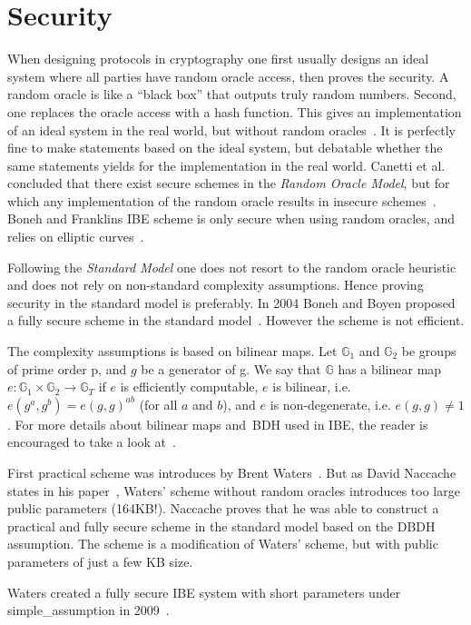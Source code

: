 \section{Security}\label{ibe-secureness}
When designing protocols in cryptography one first usually designs an ideal system where all parties have random oracle access, then proves the security.
A random oracle is like a ``black box'' that outputs truly random numbers.
Second, one replaces the oracle access with a hash function.
This gives an implementation of an ideal system in the real world, but without random oracles~\cite{DBLP:conf/ccs/BellareR93}. 
It is perfectly fine to make statements based on the ideal system, but debatable whether the same statements yields for the implementation in the real world.
Canetti et al. concluded that there exist secure schemes in the \textit{Random Oracle Model}, but for which any implementation of the random oracle results in insecure schemes~\cite{DBLP:journals/jacm/CanettiGH04}.
Boneh and Franklins \gls{IBE} scheme is only secure when using random oracles, and relies on elliptic curves~\cite{DBLP:conf/crypto/BonehF01}.

Following the \textit{Standard Model} one does not resort to the random oracle heuristic and does not rely on non-standard complexity assumptions.
Hence proving security in the standard model is preferably.
In 2004 Boneh and Boyen proposed a fully secure scheme in the standard model~\cite{DBLP:conf/crypto/BonehB04}.
However the scheme is not efficient. 

The complexity assumptions is based on bilinear maps.
Let $\mathbb{G}_1$ and $\mathbb{G}_2$ be groups of prime order \gls{p}, and $g$ be a generator of \gls{g}. 
We say that $\mathbb{G}$ has a bilinear map $e : \mathbb{G}_1 \times \mathbb{G}_2 \to \mathbb{G}_T$ if $e$ is efficiently computable, $e$ is bilinear, i.e. $e(g^a, g^b) = e(g, g)^{ab}$ (for all $a$ and $b$), and $e$ is non-degenerate, i.e. $e(g,g)\neq 1$.
For more details about bilinear maps and~\gls{BDH} used in \gls{IBE}, the reader is encouraged to take a look at~\cite{DBLP:conf/crypto/BonehF01,DBLP:journals/iacr/Naccache05}.

First practical scheme was introduces by Brent Waters~\cite{DBLP:journals/iacr/Waters04}.
But as David Naccache states in his paper~\cite{DBLP:journals/iacr/Naccache05}, Waters' scheme without random oracles introduces too large public parameters (164\gls{KB}!).
Naccache proves that he was able to construct a practical and fully secure scheme in the standard model based on the \gls{DBDH} assumption.
The scheme is a modification of Waters' scheme, but with public parameters of just a few \gls{KB} size.

Waters created a fully secure \gls{IBE} system with short parameters under \gls{simple_assumption} in 2009~\cite{DBLP:conf/crypto/Waters09}.



